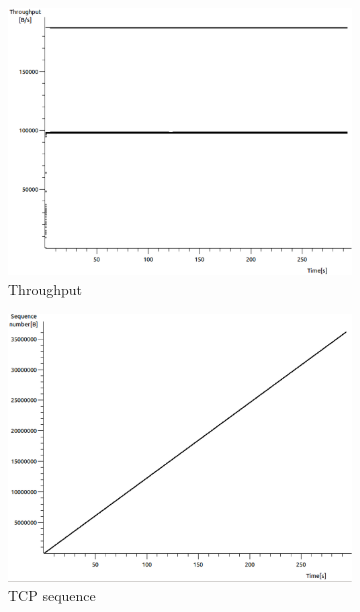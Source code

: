 \documentclass[conference,a4paper]{IEEEtran}
\begin{document}
\begin{figure}
 \centering
 \begin{subfigure}[b]{0.2\textwidth}
  \includegraphics[width=\textwidth]{s4-0_thru}
  \caption{Throughput}
 \end{subfigure}
 \begin{subfigure}[b]{0.2\textwidth}
  \includegraphics[width=\textwidth]{s4-0_seq}
  \caption{TCP sequence}
 \end{subfigure}
 \begin{subfigure}[b]{0.2\textwidth}

\end{subfigure}
\end{figure}
\end{document}

